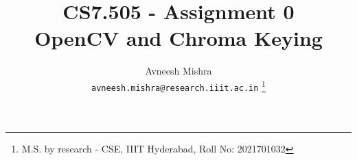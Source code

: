 

{
   \fancyhf{}
   \renewcommand{\headrulewidth}{0pt} %
}

\title{CS7.505 - Assignment 0 \\
    \Large OpenCV and Chroma Keying}

\author{
    Avneesh Mishra \\
    \texttt{avneesh.mishra@research.iiit.ac.in}
    \thanks{M.S. by research - CSE, IIIT Hyderabad, Roll No: 2021701032}
}


    \maketitle
    \thispagestyle{fancy_tr_rno}
    \tableofcontents

